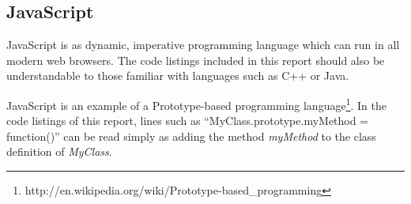 \subsection{JavaScript}
JavaScript is as dynamic, imperative programming language which can run in all modern web browsers. The code listings included in this report should also be understandable to those familiar with languages such as C++ or Java.

JavaScript is an example of a Prototype-based programming language\footnote{http://en.wikipedia.org/wiki/Prototype-based\_programming}. In the code listings of this report, lines such as ``MyClass.prototype.myMethod = function()'' can be read simply as adding the method \textit{myMethod} to the class definition of \textit{MyClass}.